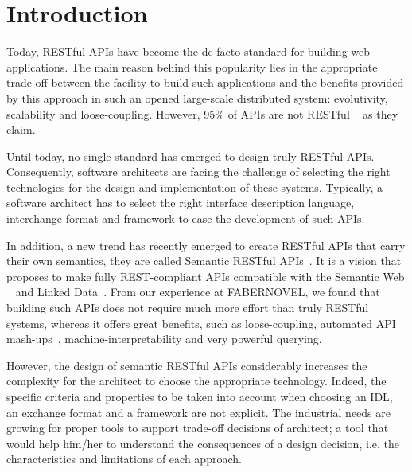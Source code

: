 \section{Introduction}

\vspace*{-0.2cm}


Today, RESTful APIs \cite{FieldingThesis} have become the de-facto standard for building web applications. The main reason behind this popularity lies in the appropriate trade-off between the facility to build such applications and the benefits provided by this approach in such an opened large-scale distributed system: evolutivity, scalability and loose-coupling. However, 95\% of APIs are not RESTful ~\cite{10.1007/978-3-319-38791-8_2} as they claim.

Until today, no single standard has emerged to design truly RESTful APIs. Consequently, software architects are facing the challenge of selecting the right technologies for the design and implementation of these systems. Typically, a software architect has to select the right interface description language, interchange format and framework to ease the development of such APIs.

In addition, a new trend has recently emerged to create RESTful APIs that carry their own semantics, they are called Semantic RESTful APIs~\cite{7195633}. It is a vision that proposes to make fully REST-compliant APIs compatible with the Semantic Web ~\cite{TheSemanticWeb} and Linked Data~\cite{LinkedDataPrinciples}. From our experience at FABERNOVEL, we found that building such APIs does not require much more effort than truly RESTful systems, whereas it offers great benefits, such as loose-coupling, automated API mash-ups~\cite{benslimane2008services}, machine-interpretability and very powerful querying. 

However, the design of semantic RESTful APIs considerably increases the complexity for the architect to choose the appropriate technology. Indeed, the specific criteria and properties to be taken into account when choosing an IDL, an exchange format and a framework are not explicit. 
The industrial needs are growing for  proper tools to support trade-off decisions of architect; a tool that would help him/her  to understand the consequences of a design decision, i.e. the characteristics and limitations of each approach. 


